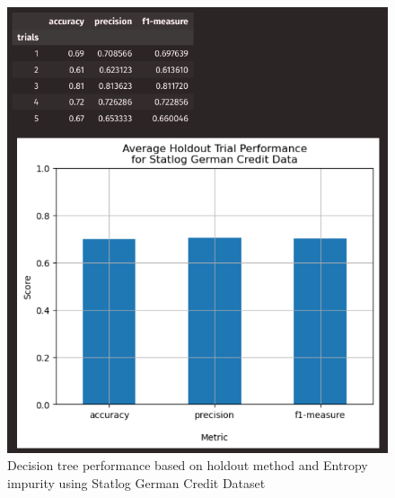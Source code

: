 \documentclass{article}
\begin{document}
    \begin{figure}[H]
        \centering
        \begin{minipage}[t]{0.47\textwidth}
            \centering
            \includegraphics[width=\textwidth, height=0.35\textheight]{2hg.png}
            \caption{Decision tree performance based on holdout method and Entropy impurity using Statlog German Credit Dataset}
        \end{minipage}
        \hfill
        \begin{minipage}[t]{0.47\textwidth}
            \centering

\end{minipage}
\end{figure}
\end{document}

